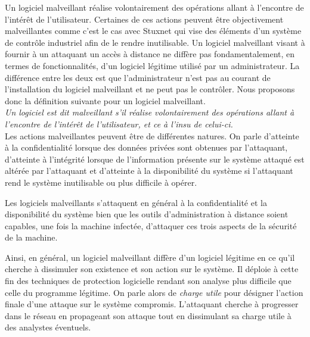 Un logiciel malveillant réalise volontairement des opérations allant à l'encontre de l'intérêt de l'utilisateur. 
Certaines de ces actions peuvent être objectivement malveillantes comme c'est le cas avec Stuxnet qui vise des éléments d'un système de contrôle industriel afin de le rendre inutilisable. 
Un logiciel malveillant visant à fournir à un attaquant un accès à distance ne diffère pas fondamentalement, en termes de fonctionnalités, d'un logiciel légitime utilisé par un administrateur.
La différence entre les deux est que l'administrateur n'est pas au courant de l'installation du logiciel malveillant et ne peut pas le contrôler.
Nous proposons donc la définition suivante pour un logiciel malveillant.
\\

\textit{Un logiciel est dit malveillant s'il réalise volontairement des opérations allant à l'encontre de l'intérêt de l'utilisateur, et ce à l'insu de celui-ci.}
\\ 

Les actions malveillantes peuvent être de différentes natures. On parle d'atteinte à la confidentialité lorsque des données privées sont obtenues par l'attaquant, d'atteinte à l'intégrité lorsque de l'information présente sur le système attaqué est altérée par l'attaquant et d'atteinte à la disponibilité du système si l'attaquant rend le système inutilisable ou plus difficile à opérer.

Les logiciels malveillants s'attaquent en général à la confidentialité et la disponibilité du système bien que les outils d'administration à distance soient capables, une fois la machine infectée, d'attaquer ces trois aspects de la sécurité de la machine.

Ainsi, en général, un logiciel malveillant diffère d'un logiciel légitime en ce qu'il cherche à dissimuler son existence et son action sur le système. Il déploie à cette fin des techniques de protection logicielle rendant son analyse plus difficile que celle du programme légitime.
On parle alors de \emph{charge utile} pour désigner l'action finale d'une attaque sur le système compromis. L'attaquant cherche à progresser dans le réseau en propageant son attaque tout en dissimulant sa charge utile à des analystes éventuels.



